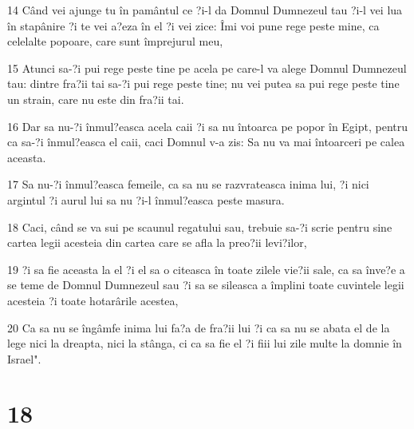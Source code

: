 \par 14 Când vei ajunge tu în pamântul ce ?i-l da Domnul Dumnezeul tau ?i-l vei lua în stapânire ?i te vei a?eza în el ?i vei zice: Îmi voi pune rege peste mine, ca celelalte popoare, care sunt împrejurul meu,
\par 15 Atunci sa-?i pui rege peste tine pe acela pe care-l va alege Domnul Dumnezeul tau: dintre fra?ii tai sa-?i pui rege peste tine; nu vei putea sa pui rege peste tine un strain, care nu este din fra?ii tai.
\par 16 Dar sa nu-?i înmul?easca acela caii ?i sa nu întoarca pe popor în Egipt, pentru ca sa-?i înmul?easca el caii, caci Domnul v-a zis: Sa nu va mai întoarceri pe calea aceasta.
\par 17 Sa nu-?i înmul?easca femeile, ca sa nu se razvrateasca inima lui, ?i nici argintul ?i aurul lui sa nu ?i-l înmul?easca peste masura.
\par 18 Caci, când se va sui pe scaunul regatului sau, trebuie sa-?i scrie pentru sine cartea legii acesteia din cartea care se afla la preo?ii levi?ilor,
\par 19 ?i sa fie aceasta la el ?i el sa o citeasca în toate zilele vie?ii sale, ca sa înve?e a se teme de Domnul Dumnezeul sau ?i sa se sileasca a împlini toate cuvintele legii acesteia ?i toate hotarârile acestea,
\par 20 Ca sa nu se îngâmfe inima lui fa?a de fra?ii lui ?i ca sa nu se abata el de la lege nici la dreapta, nici la stânga, ci ca sa fie el ?i fiii lui zile multe la domnie în Israel".

\chapter{18}

